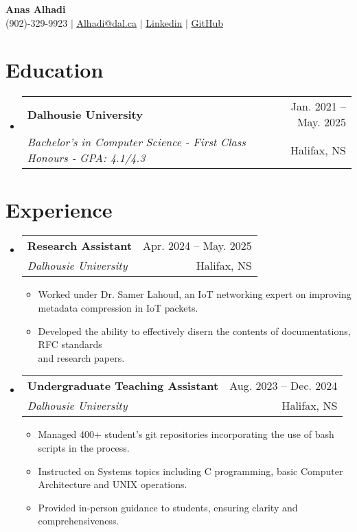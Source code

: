 \documentclass[letterpaper,11pt]{article}
\makeatletter
\newcommand{\resumeItem}[1]{
  \item\small{
    {#1 \vspace{-2pt}}
  }
}
\newcommand{\resumeSubheading}[4]{
  \vspace{-2pt}\item
    \begin{tabular*}{0.97\textwidth}[t]{l@{\extracolsep{\fill}}r}
      \textbf{#1} & #2 \\
			\textit{\small#3} & \small #4 \\
    \end{tabular*}\vspace{-7pt}
}
\newcommand{\resumeSubHeadingListStart}{\begin{itemize}[leftmargin=0.15in, label={}]}
\newcommand{\resumeSubHeadingListEnd}{\end{itemize}}
\newcommand{\resumeItemListStart}{\begin{itemize}}
\newcommand{\resumeItemListEnd}{\end{itemize}\vspace{-5pt}}
\makeatother
\begin{document}

\begin{center}
    \textbf{\Huge Anas Alhadi} \\ \vspace{1pt}
		\small (902)-329-9923 $|$ \label{contact_info}\href{mailto:Alhadi@dal.ca}{\underline{Alhadi@dal.ca}} $|$ 
    \href{https://linkedin.com/in/anas-alhadi}{\underline{Linkedin}}
$|$ 
    \href{https://github.com/pthread-me}{\underline{GitHub}}
    
\end{center}


\section{Education}
  \resumeSubHeadingListStart
    \resumeSubheading
      {Dalhousie University}{Jan. 2021 -- May. 2025}
      {Bachelor's in Computer Science - First Class Honours - GPA: 4.1/4.3}
      {Halifax, NS}
    
  \resumeSubHeadingListEnd


\section{Experience}
  \resumeSubHeadingListStart

	\resumeSubheading
      {Research Assistant}{Apr. 2024 -- May. 2025  }
      {Dalhousie University}{Halifax, NS}
      \resumeItemListStart
        \resumeItem{Worked under Dr. Samer Lahoud, an IoT networking expert on improving\\ metadata compression in IoT packets.}
        \resumeItem{Developed the ability to effectively disern the contents of documentations, RFC standards\\ and research papers.}
      \resumeItemListEnd 


  \resumeSubheading
		{Undergraduate Teaching Assistant}{Aug. 2023 -- Dec. 2024 }
      {Dalhousie University}{Halifax, NS}
      \resumeItemListStart
        \resumeItem{Managed 400+ student's git repositories incorporating the use of bash scripts in the process.}
        \resumeItem{Instructed on Systems topics including  C programming, basic Computer Architecture and UNIX operations.}
        \resumeItem{Provided in-person guidance to students, ensuring clarity and comprehensiveness.}
      \resumeItemListEnd 
  \resumeSubHeadingListEnd
\end{document}

